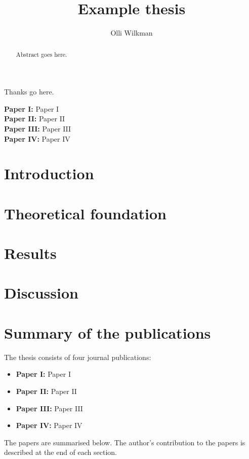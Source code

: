 \documentclass[a4paper,11pt,english]{report}
\title{Example thesis}
\author{Olli Wilkman}
\begin{document}
\frontmatter

\maketitle


\begin{abstract}
	Abstract goes here.
\end{abstract}

\begin{acknowledgements}
	Thanks go here.
\end{acknowledgements}


\begin{publications}
	\textbf{Paper I:} Paper I \\
	\newline
	\textbf{Paper II:} Paper II \\
	\newline
	\textbf{Paper III:} Paper III \\
	\newline
	\textbf{Paper IV:} Paper IV
\end{publications}

\pagestyle{headings}
\tableofcontents

\mainmatter

\chapter{Introduction}
\setcounter{page}{1} %


\chapter{Theoretical foundation}


\chapter{Results}


\chapter{Discussion}


\chapter{Summary of the publications}
The thesis consists of four journal publications:
\begin{itemize}
  \item \textbf{Paper I:} Paper I
  \item \textbf{Paper II:} Paper II
  \item \textbf{Paper III:} Paper III
  \item \textbf{Paper IV:} Paper IV
\end{itemize}
The papers are summarised below. The author's contribution to the papers is described at the end of each section.
\end{document}
